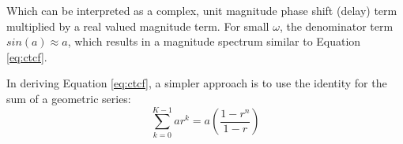 \documentclass{article}
\begin{document}
Which can be interpreted as a complex, unit magnitude phase shift (delay) term multiplied by a real valued magnitude term.  For small $\omega$, the denominator term $sin(a) \approx a$, which results in a magnitude spectrum similar to Equation \ref{eq:ctcf}.

In deriving Equation \ref{eq:ctcf}, a simpler approach is to use the identity for the sum of a geometric series:
\begin{equation} \label{eq_geosum}
\sum_{k=0}^{K-1} ar^k = a \left( \frac{1-r^n}{1-r} \right)
\end{equation}



\end{document}

